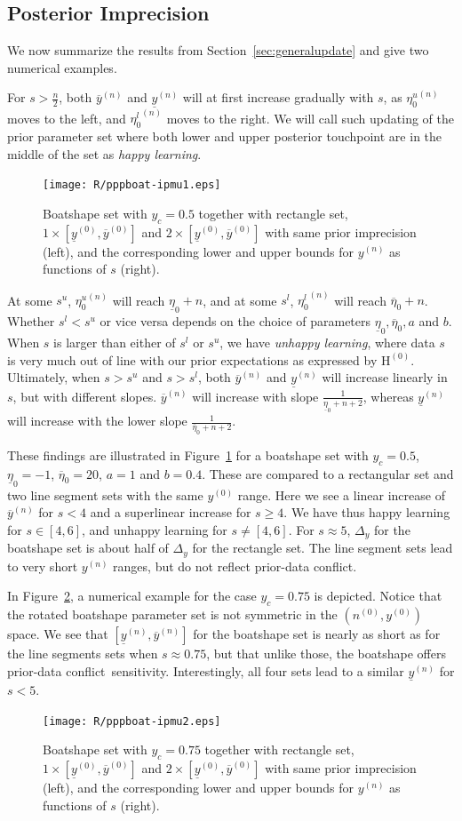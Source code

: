 \documentclass[runningheads,a4paper]{llncs}
\def\pdc{prior-data conflict}
\newcommand{\uz}{^{(0)}} %
\newcommand{\un}{^{(n)}} %
\newcommand{\ul}[1]{\underline{#1}}
\newcommand{\ol}[1]{\overline{#1}}
\def\yz{y\uz}
\def\yn{y\un}
\def\yzl{\ul{y}\uz}
\def\yzu{\ol{y}\uz}
\def\ynl{\ul{y}\un}
\def\ynu{\ol{y}\un}
\def\nz{n\uz}
\def\EZ{\mathrm{H}\uz}
\def\ezl{\ul{\eta}_0}
\def\ezu{\ol{\eta}_0}
\begin{document}
\subsection{Posterior Imprecision}
\label{sec:posteriorimprecision}

We now summarize the results from Section~\ref{sec:generalupdate}
and give two numerical examples.

For $s > \frac{n}{2}$, both $\ynu$ and $\ynl$ will at first increase gradually with $s$,
as ${\eta_0^u}\un$ moves to the left, and ${\eta_0^l}\un$ moves to the right.
We will call such updating of the prior parameter set
where both lower and upper posterior touchpoint are in the middle of the set as \emph{happy learning}.
\begin{figure}
\texttt{[image: R/pppboat-ipmu1.eps]}
\caption{Boatshape set with $y_c = 0.5$ together with rectangle set, $1 \times [\yzl, \yzu]$ and $2 \times [\yzl, \yzu]$
with same prior imprecision (left),
and the corresponding lower and upper bounds for $\yn$ as functions of $s$ (right).}
\label{fig:ppp1}
\end{figure}
%
At some $s^u$, ${\eta_0^u}\un$ will reach $\ezl + n$,
and at some $s^l$, ${\eta_0^l}\un$ will reach $\ezu + n$.
Whether $s^l < s^u$ or vice versa depends on
the choice of parameters $\ezl, \ezu, a$ and $b$.
When $s$ is larger than either of $s^l$ or $s^u$,
we have \emph{unhappy learning},
where data $s$ is very much out of line with our prior expectations as expressed by $\EZ$.
Ultimately, when $s > s^u$ and $s > s^l$,
both $\ynu$ and $\ynl$ will increase linearly in $s$, but with different slopes.
$\ynu$ will increase with slope $\frac{1}{\ezl + n + 2}$,
whereas $\ynl$ will increase with the lower slope $\frac{1}{\ezu + n + 2}$.

These findings are illustrated in Figure~\ref{fig:ppp1}
for a boatshape set with $y_c = 0.5$, $\ezl = -1$, $\ezu = 20$, $a=1$ and $b=0.4$. 
These are compared to a rectangular set and two line segment sets with the same $\yz$ range.
Here we see a linear increase of $\ynu$ for $s < 4$ and a superlinear increase for $s \ge 4$.
We have thus happy learning for $s \in [4,6]$, and unhappy learning for $s \neq [4,6]$.
For $s \approx 5$, $\Delta_y$ for the boatshape set is about half of $\Delta_y$ for the rectangle set.
The line segment sets lead to very short $\yn$ ranges, but do not reflect \pdc.

In Figure~\ref{fig:ppp2}, a numerical example for the case $y_c = 0.75$ is depicted.
Notice that the rotated boatshape parameter set is not symmetric in the $(\nz, \yz)$ space.
We see that $[\ynl, \ynu]$ for the boatshape set is nearly as short as for the line segments sets
when $s \approx 0.75$, but that unlike those, the boatshape offers \pdc\ sensitivity.
Interestingly, all four sets lead to a similar $\ynl$ for $s < 5$.
\begin{figure}
\texttt{[image: R/pppboat-ipmu2.eps]}
\caption{Boatshape set with $y_c = 0.75$ together with rectangle set, $1 \times [\yzl, \yzu]$ and $2 \times [\yzl, \yzu]$
with same prior imprecision (left),
and the corresponding lower and upper bounds for $\yn$ as functions of $s$ (right).}
\label{fig:ppp2}
\end{figure}
\end{document}
